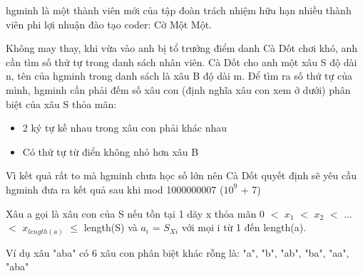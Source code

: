 hgminh là một thành viên mới của tập đoàn trách nhiệm hữu hạn nhiều thành viên phi lợi nhuận đào tạo coder: Cờ Một Một.  

   Không may thay, khi vừa vào anh bị tổ trưởng điểm danh Cà Dốt chơi khó, anh cần tìm số thứ tự trong danh sách nhân viên. Cà Dốt cho anh một xâu S độ dài n, tên của hgminh trong danh sách là xâu B độ dài m. Để tìm ra số thứ tự của mình, hgminh cần phải đếm số xâu con (định nghĩa xâu con xem ở dưới) phân biệt của xâu S thỏa mãn:  
\begin{itemize}
	\item     2 ký tự kề nhau trong xâu con phải khác nhau   
	\item     Có thứ tự từ điển không nhỏ hơn xâu B   
\end{itemize}

   Vì kết quả rất to mà hgminh chưa học số lớn nên Cà Dốt quyết định sẽ yêu cầu hgminh đưa ra kết quả sau khi mod 1000000007 ($10^{9}$   + 7)  



   Xâu a gọi là xâu con của S nếu tồn tại 1 dãy x thỏa mãn 0 $<$ $x_{1}$   $<$ $x_{2}$   $<$ ...$<$ $x_{length(a)}$    $\le$  length(S) và $a_{i}$   = $S_{Xi}$   với mọi i từ 1 đến length(a).  

   Ví dụ xâu "aba" có 6 xâu con phân biệt khác rỗng là: "a", "b", "ab", "ba", "aa", "aba"